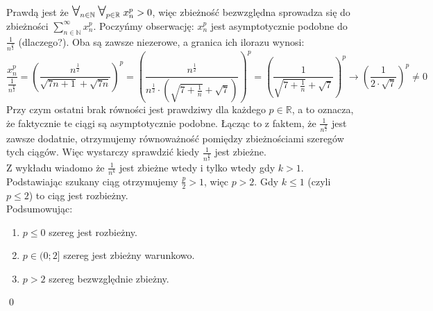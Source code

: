 \documentclass[11pt]{article}
\newcommand{\R}{\mathbb{R}}
\newcommand{\N}{\mathbb{N}}
\newcommand{\Forall}{{\Large\mbox{$\forall$}}}
\begin{document}
Prawdą jest że $\Forall_{n \in \N} \; \Forall_{p \in \R} \; x_n^p > 0$, więc zbieżność bezwzględna sprowadza się do zbieżności $\sum_{n\in\N}^\infty x_n^p$. Poczyńmy obserwację: $x_n^p$ jest asymptotycznie podobne do $\frac{1}{n^{\frac{p}{2}}}$ (dlaczego?). Oba są zawsze niezerowe, a granica ich ilorazu wynosi:
$$\frac{x_n^p}{\frac{1}{n^{\frac{p}{2}}}} = \left(\frac{n^{\frac{1}{2}}}{\sqrt{7n+1} + \sqrt{7n}}\right)^p = \left(\frac{n^{\frac{1}{2}}}{n^{\frac{1}{2}} \cdot \left(\sqrt{7+\frac{1}{n}} + \sqrt{7}\right)}\right)^p = \left(\frac{1}{\sqrt{7+\frac{1}{n}} + \sqrt{7}}\right)^p \longrightarrow \left(\frac{1}{2\cdot \sqrt{7}} \right)^p \neq 0$$
Przy czym ostatni brak równości jest prawdziwy dla każdego $p \in \R$, a to oznacza, że faktycznie te ciągi są asymptotycznie podobne. Łącząc to z faktem, że $\frac{1}{n^{\frac{p}{2}}}$ jest zawsze dodatnie, otrzymujemy równoważność pomiędzy zbieżnościami szeregów tych ciągów. Więc wystarczy sprawdzić kiedy $\frac{1}{n^{\frac{p}{2}}}$ jest zbieżne. \\[5pt]
Z wykładu wiadomo że $\frac{1}{n^k}$ jest zbieżne wtedy i tylko wtedy gdy $k > 1$. Podstawiając szukany ciąg otrzymujemy $\frac{p}{2} > 1$, więc $p > 2$. Gdy $k \leq 1$ (czyli $p \leq 2$) to ciąg jest rozbieżny. \\[10pt]
Podsumowując:
\begin{enumerate}
    \item $p \leq 0$ szereg jest rozbieżny.

    \item $p \in (0; 2]$ szereg jest zbieżny warunkowo.

    \item $p > 2$ szereg bezwzględnie zbieżny.
\end{enumerate} \qed
\end{document}
